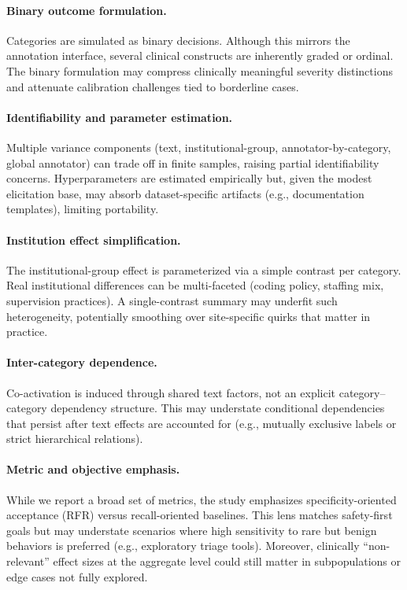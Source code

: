 \documentclass[12pt]{article}
\begin{document}
\paragraph{Binary outcome formulation.}
Categories are simulated as binary decisions. Although this mirrors the annotation interface, several clinical constructs are inherently graded or ordinal. The binary formulation may compress clinically meaningful severity distinctions and attenuate calibration challenges tied to borderline cases.

\paragraph{Identifiability and parameter estimation.}
Multiple variance components (text, institutional-group, annotator-by-category, global annotator) can trade off in finite samples, raising partial identifiability concerns. Hyperparameters are estimated empirically but, given the modest elicitation base, may absorb dataset-specific artifacts (e.g., documentation templates), limiting portability.

\paragraph{Institution effect simplification.}
The institutional-group effect is parameterized via a simple contrast per category. Real institutional differences can be multi-faceted (coding policy, staffing mix, supervision practices). A single-contrast summary may underfit such heterogeneity, potentially smoothing over site-specific quirks that matter in practice.

\paragraph{Inter-category dependence.}
Co-activation is induced through shared text factors, not an explicit category–category dependency structure. This may understate conditional dependencies that persist after text effects are accounted for (e.g., mutually exclusive labels or strict hierarchical relations).

\paragraph{Metric and objective emphasis.}
While we report a broad set of metrics, the study emphasizes specificity-oriented acceptance (RFR) versus recall-oriented baselines. This lens matches safety-first goals but may understate scenarios where high sensitivity to rare but benign behaviors is preferred (e.g., exploratory triage tools). Moreover, clinically “non-relevant” effect sizes at the aggregate level could still matter in subpopulations or edge cases not fully explored.
\end{document}
